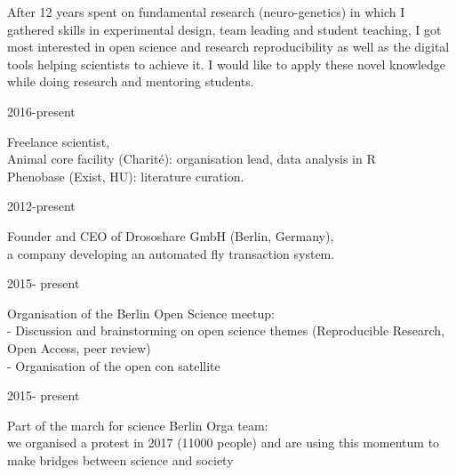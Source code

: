 
After 12 years spent on fundamental research (neuro-genetics) in which I gathered skills in experimental design, team leading and student teaching, I got most interested in open science and research reproducibility as well as the digital tools helping scientists to achieve it.
I would like to apply these novel knowledge while doing research and mentoring students.


%
\parbox{0.15\textwidth}{2016-present}\hfill
\parbox[t]{0.83\textwidth}{Freelance scientist,\\
        Animal core facility (Charit\'e): organisation lead, data analysis in R\\
        Phenobase (Exist, HU): literature curation.}
        

\parbox{0.15\textwidth}{2012-present}\hfill
\parbox[t]{0.83\textwidth}{Founder and CEO 
       of Drososhare GmbH (Berlin, Germany),\\
        a company developing an automated fly transaction system.}


  
 \parbox{0.15\textwidth}{2015- present}\hfill
\parbox[t]{0.83\textwidth}{Organisation of the Berlin Open Science meetup:\\
- Discussion and brainstorming on open science themes (Reproducible Research, Open Access, peer review) \\
- Organisation of the open con satellite}     

 \parbox{0.15\textwidth}{2015- present}\hfill
\parbox[t]{0.83\textwidth}{Part of the march for science Berlin Orga team:\\
we organised a protest in 2017 (11000 people) and are using this momentum to make bridges between science and society}   
                
